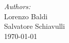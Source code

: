 \begin{titlepage}
\Large \emph{Authors:}\\
Lorenzo Baldi\\Salvatore Schiavulli\\ [3cm] %


{\large \today}\\[3cm] %


 

\vfill %

\end{titlepage}
